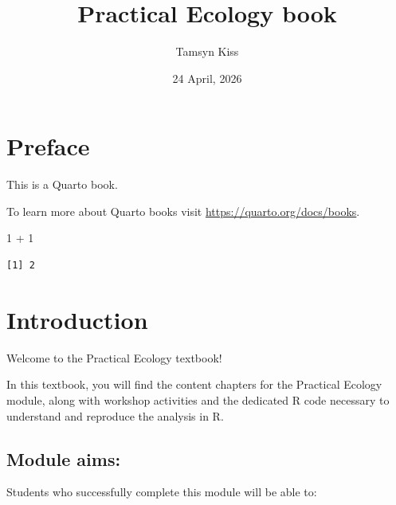 \documentclass[
  letterpaper,
  DIV=11,
  numbers=noendperiod]{scrreprt}
\title{Practical Ecology book}
\author{Tamsyn Kiss}
\date{24 April, 2026}
\newenvironment{Shaded}{\begin{snugshade}}{\end{snugshade}}
\newcommand{\DecValTok}[1]{\textcolor[rgb]{0.68,0.00,0.00}{#1}}
\newcommand{\SpecialCharTok}[1]{\textcolor[rgb]{0.37,0.37,0.37}{#1}}
\renewcommand*\contentsname{Table of contents}
\newcommand\contentsname{Table of contents}
\begin{document}
\maketitle

\renewcommand*\contentsname{Table of contents}
{
\hypersetup{linkcolor=}
\setcounter{tocdepth}{2}
\tableofcontents
}


\chapter*{Preface}\label{preface}


This is a Quarto book.

To learn more about Quarto books visit
\url{https://quarto.org/docs/books}.

\begin{Shaded}
\begin{Highlighting}[]
\DecValTok{1} \SpecialCharTok{+} \DecValTok{1}
\end{Highlighting}
\end{Shaded}

\begin{verbatim}
[1] 2
\end{verbatim}


\chapter*{Introduction}\label{introduction}


Welcome to the Practical Ecology textbook!

In this textbook, you will find the content chapters for the Practical
Ecology module, along with workshop activities and the dedicated R code
necessary to understand and reproduce the analysis in R.

\section*{Module aims:}\label{module-aims}


Students who successfully complete this module will be able to:
\end{document}
